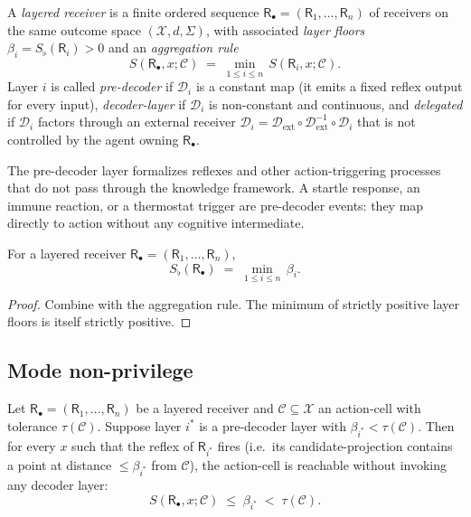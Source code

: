 \documentclass[twocolumn,11pt,a4paper]{article}
\newcommand{\D}{\mathcal{D}}
\newcommand{\X}{\mathcal{X}}
\newcommand{\Cell}{\mathcal{C}}
\newcommand{\receiver}{\mathsf{R}}
\newcommand{\Sfloor}{S_{\flat}}
\begin{document}
\begin{definition}\label{def:layered}
A \emph{layered receiver} is a finite ordered sequence
$\receiver_\bullet=(\receiver_1,\dots,\receiver_n)$ of receivers on the same
outcome space $(\X,d,\Sigma)$, with associated \emph{layer floors}
$\beta_i=\Sfloor(\receiver_i)>0$ and an \emph{aggregation rule}
\[
S(\receiver_\bullet,x;\Cell)\;=\;\min_{1\le i\le n}\,S(\receiver_i,x;\Cell).
\]
Layer $i$ is called \emph{pre-decoder} if $\D_i$ is a constant map (it
emits a fixed reflex output for every input), \emph{decoder-layer} if
$\D_i$ is non-constant and continuous, and \emph{delegated} if $\D_i$
factors through an external receiver
$\D_i=\D_{\mathrm{ext}}\circ\D_{\mathrm{ext}}^{-1}\circ\D_i$ that is not
controlled by the agent owning $\receiver_\bullet$.
\end{definition}

\begin{remark}\label{rem:reflex}
The pre-decoder layer formalizes reflexes and other action-triggering
processes that do not pass through the knowledge framework. A startle
response, an immune reaction, or a thermostat trigger are pre-decoder
events: they map directly to action without any cognitive intermediate.
\end{remark}

\begin{proposition}\label{prop:layered-floor}
For a layered receiver $\receiver_\bullet=(\receiver_1,\dots,\receiver_n)$,
\[
\Sfloor(\receiver_\bullet)\;=\;\min_{1\le i\le n}\,\beta_i.
\]
\end{proposition}

\begin{proof}
Combine  with the aggregation rule. The minimum of
strictly positive layer floors is itself strictly positive.
\end{proof}

\subsection{Mode non-privilege}

\begin{theorem}\label{thm:mode-nonpriv}
Let $\receiver_\bullet=(\receiver_1,\dots,\receiver_n)$ be a layered
receiver and $\Cell\subseteq\X$ an action-cell with tolerance
$\tau(\Cell)$. Suppose layer $i^*$ is a pre-decoder layer with
$\beta_{i^*}<\tau(\Cell)$. Then for every $x$ such that the reflex of
$\receiver_{i^*}$ fires (i.e.\ its candidate-projection contains a point
at distance $\le\beta_{i^*}$ from $\Cell$), the action-cell is reachable
without invoking any decoder layer:
\[
S(\receiver_\bullet,x;\Cell)\;\le\;\beta_{i^*}\;<\;\tau(\Cell).
\]
\end{theorem}
\end{document}
